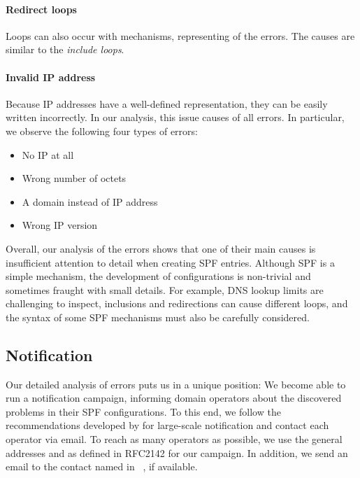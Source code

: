 \paragraph{Redirect loops}
Loops can also occur with  mechanisms, representing \SPFRedirectLoopPerc of the errors.
The causes are similar to the \emph{include loops}.

\paragraph{Invalid IP address}
Because IP addresses have a well-defined representation, they can be easily written incorrectly. In our analysis,  this issue causes \SPFInvalidIPPerc of all errors. In particular, we observe the following four types of errors:%
\begin{itemize}
	\item No IP at all
	\item Wrong number of octets
	\item A domain instead of IP address
	\item Wrong IP version
\end{itemize}

\smallskip
\noindent %
Overall, our analysis of the errors shows that one of their main causes is insufficient attention to detail when creating SPF entries. Although SPF is a simple mechanism, the development of configurations is non-trivial and sometimes fraught with small details. For example, DNS lookup limits are challenging to inspect, inclusions and redirections can cause different loops, and the syntax of some SPF mechanisms must also be carefully considered.

\subsection{Notification}

Our detailed analysis of errors puts us in a unique position: We become able to run a notification campaign, informing domain operators about the discovered problems in their SPF configurations. To this end, we follow the recommendations developed by \citet{Stock2016, Stock2018} for large-scale notification and contact each operator via email. To reach as many operators as possible, we use the general addresses  and  as defined in RFC2142 \cite{rfc2142} for our campaign. In addition, we send an email to the contact named in ~\citep{rfc9116}, if available.

